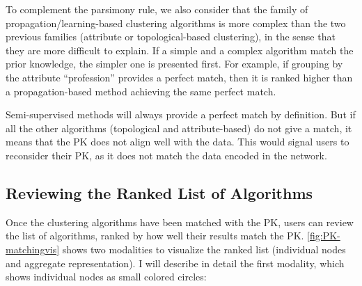To complement the parsimony rule, we also consider that the family of propagation/learning-based clustering algorithms is more complex than the two previous families (attribute or topological-based clustering), in the sense that they are more difficult to explain.
If a simple and a complex algorithm match the prior knowledge, the simpler one is presented first. For example, if grouping by the attribute ``profession'' provides a perfect match, then it is ranked higher than a propagation-based method achieving the same perfect match.

Semi-supervised methods will always provide a perfect match by definition. But if all the other algorithms (topological and attribute-based) do not give a match, it means that the PK does not align well with the data. This would signal users to reconsider their PK, as it does not match the data encoded in the network.

\subsection{Reviewing the Ranked List of Algorithms}


Once the clustering algorithms have been matched with the PK, users can review the list of algorithms, ranked by how well their results match the PK.
\autoref{fig:PK-matchingvis} shows two modalities to visualize the ranked list (individual nodes and aggregate representation).
I will describe in detail the first modality, which shows individual nodes as small colored circles:

%


